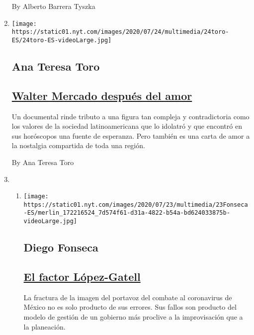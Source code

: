 \begin{enumerate}
  By Alberto Barrera Tyszka
\item
  \texttt{[image: https://static01.nyt.com/images/2020/07/24/multimedia/24toro-ES/24toro-ES-videoLarge.jpg]}

  \hypertarget{ana-teresa-toro}{%
  \subsection{Ana Teresa Toro}\label{ana-teresa-toro}}

  \hypertarget{walter-mercado-despuuxe9s-del-amor}{%
  \subsection{\texorpdfstring{\href{/es/2020/07/24/espanol/opinion/walter-mercado-amor-netflix.html}{Walter
  Mercado después del
  amor}}{Walter Mercado después del amor}}\label{walter-mercado-despuuxe9s-del-amor}}

  Un documental rinde tributo a una figura tan compleja y contradictoria
  como los valores de la sociedad latinoamericana que lo idolatró y que
  encontró en sus horóscopos una fuente de esperanza. Pero también es
  una carta de amor a la nostalgia compartida de toda una región.

  By Ana Teresa Toro
\item
  \begin{enumerate}
  \def\labelenumii{\arabic{enumii}.}
  \item
    \texttt{[image: https://static01.nyt.com/images/2020/07/23/multimedia/23Fonseca-ES/merlin\_172216524\_7d574f61-d31a-4822-b54a-bd624033875b-videoLarge.jpg]}

    \hypertarget{diego-fonseca}{%
    \subsection{Diego Fonseca}\label{diego-fonseca}}

    \hypertarget{el-factor-luxf3pez-gatell}{%
    \subsection{\texorpdfstring{\href{/es/2020/07/23/espanol/opinion/lopez-gatell.html}{El
    factor
    López-Gatell}}{El factor López-Gatell}}\label{el-factor-luxf3pez-gatell}}

    La fractura de la imagen del portavoz del combate al coronavirus de
    México no es solo producto de sus errores. Sus fallos son producto
    del modelo de gestión de un gobierno más proclive a la improvisación
    que a la planeación.


\end{enumerate}
\end{enumerate}

